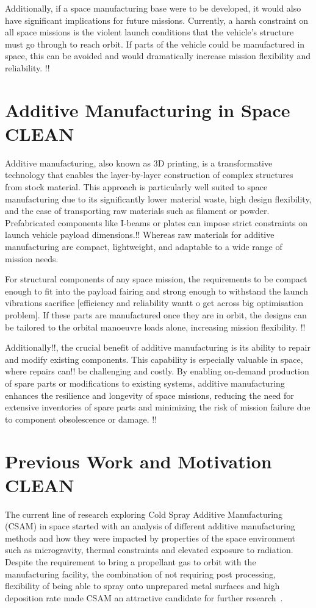 Additionally, if a space manufacturing base were to be developed, it would also have significant implications for future missions. Currently, a harsh constraint on all space missions is the violent launch conditions that the vehicle's structure must go through to reach orbit. If parts of the vehicle could be manufactured in space, this can be avoided and would dramatically increase mission flexibility and reliability. !!

\newpage
\section{Additive Manufacturing in Space CLEAN}
Additive manufacturing, also known as 3D printing, is a transformative technology that enables the layer-by-layer construction of complex structures from stock material. This approach is particularly well suited to space manufacturing due to its significantly lower material waste, high design flexibility, and the ease of transporting raw materials such as filament or powder. Prefabricated components like I-beams or plates can impose strict constraints on launch vehicle payload dimensions.!! Whereas raw materials for additive manufacturing are compact, lightweight, and adaptable to a wide range of mission needs.

For structural components of any space mission, the requirements to be compact enough to fit into the payload fairing and strong enough to withstand the launch vibrations sacrifice [efficiency and reliability wantt o get across big optimisation problem]. If these parts are manufactured once they are in orbit, the designs can be tailored to the orbital manoeuvre loads alone, increasing mission flexibility. !!

Additionally!!, the crucial benefit of additive manufacturing is its ability to repair and modify existing components. This capability is especially valuable in space, where repairs can!! be challenging and costly. By enabling on-demand production of spare parts or modifications to existing systems, additive manufacturing enhances the resilience and longevity of space missions, reducing the need for extensive inventories of spare parts and minimizing the risk of mission failure due to component obsolescence or damage. !!

\section{Previous Work and Motivation CLEAN}
The current line of research exploring Cold Spray Additive Manufacturing (CSAM) in space started with an analysis of different additive manufacturing methods and how they were impacted by properties of the space environment such as microgravity, thermal constraints and elevated exposure to radiation. Despite the requirement to bring a propellant gas to orbit with the manufacturing facility, the combination of not requiring post processing, flexibility of being able to spray onto unprepared metal surfaces and high deposition rate made CSAM an attractive candidate for further research~\cite{malagowski2019amspace}.

